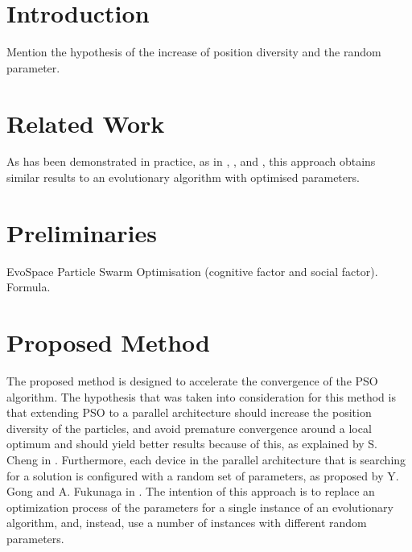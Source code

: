 \documentclass[runningheads,a4paper]{llncs}
\begin{document}
\begin{abstract}


\end{abstract}


\section{Introduction}
\label{introduction}

Mention the hypothesis of the increase of position diversity and the random parameter.

\section{Related Work}
\label{related-work}

As has been demonstrated in practice, as
in \cite{garcia2014randomized}, \cite{gong2011distributed}, and
\cite{tanabe2013evaluation}, this approach obtains similar results to
an evolutionary algorithm with optimised parameters. %

\section{Preliminaries}
\label{preliminaries}

EvoSpace
Particle Swarm Optimisation (cognitive factor and social
factor). Formula.

\section{Proposed Method}
\label{proposed-method}

The proposed method is designed to accelerate the convergence of the
PSO algorithm. The hypothesis that was taken into consideration for this method is
that extending PSO to a parallel architecture should increase the
position diversity of the particles, and avoid premature convergence around a local
optimum and should yield better results because of this, as explained
by S. Cheng in \cite{cheng2013population}. Furthermore, each device in
the parallel architecture that is searching for a solution is configured with a
random set of parameters, as proposed by Y. Gong and
A. Fukunaga in \cite{gong2011distributed}. The intention of this approach is to
replace an optimization process of the parameters for a single instance of
an evolutionary algorithm, and, instead, use a number of instances with
different random parameters.  %
\end{document}
